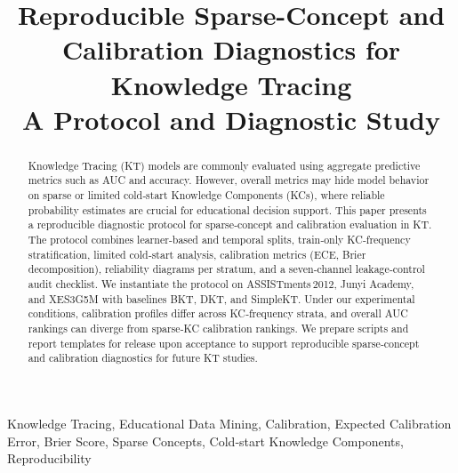 \documentclass[conference]{IEEEtran}
\begin{document}
\title{Reproducible Sparse-Concept and Calibration Diagnostics for Knowledge Tracing\\
{\large A Protocol and Diagnostic Study}}

\author{
}

\maketitle

\begin{abstract}
Knowledge Tracing (KT) models are commonly evaluated using aggregate predictive metrics such as AUC and accuracy. However, overall metrics may hide model behavior on sparse or limited cold‑start Knowledge Components (KCs), where reliable probability estimates are crucial for educational decision support. This paper presents a reproducible diagnostic protocol for sparse‑concept and calibration evaluation in KT. The protocol combines learner‑based and temporal splits, train‑only KC‑frequency stratification, limited cold‑start analysis, calibration metrics (ECE, Brier decomposition), reliability diagrams per stratum, and a seven‑channel leakage‑control audit checklist. We instantiate the protocol on ASSISTments 2012, Junyi Academy, and XES3G5M with baselines BKT, DKT, and SimpleKT. Under our experimental conditions, calibration profiles differ across KC‑frequency strata, and overall AUC rankings can diverge from sparse‑KC calibration rankings. We prepare scripts and report templates for release upon acceptance to support reproducible sparse‑concept and calibration diagnostics for future KT studies.
\end{abstract}

\begin{IEEEkeywords}
Knowledge Tracing, Educational Data Mining, Calibration, Expected Calibration Error, Brier Score, Sparse Concepts, Cold‑start Knowledge Components, Reproducibility
\end{IEEEkeywords}
\end{document}

